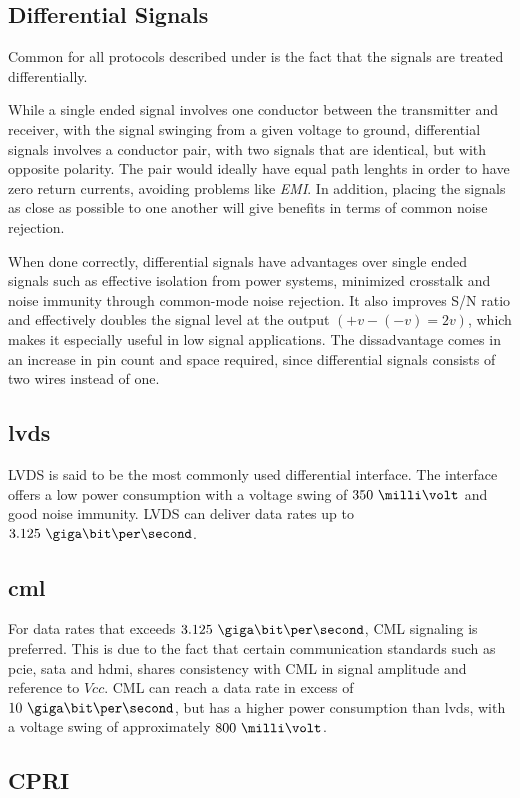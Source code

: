 \documentclass[main.tex]{subfiles}
\begin{document}
\subsection{Differential Signals} \label{subsec:diffsig}

Common for all protocols described under is the fact that the signals are treated differentially. 

While a single ended signal involves one conductor between the transmitter and receiver, with the signal swinging from a given voltage to ground, differential signals involves a conductor pair, with two signals that are identical, but with opposite polarity. The pair would ideally have equal path lenghts in order to have zero return currents, avoiding problems like \textit{EMI}. In addition, placing the signals as close as possible to one another will give benefits in terms of common noise rejection.

When done correctly, differential signals have advantages over single ended signals such as effective isolation from power systems, minimized crosstalk and noise immunity through common-mode noise rejection. It also improves S/N ratio and effectively doubles the signal level at the output $(+v - (-v) = 2v)$, which makes it especially useful in low signal applications. The dissadvantage comes in an increase in pin count and space required, since differential signals consists of two wires instead of one. \cite{douglas01}

\subsection{\acrfull{lvds}}

LVDS is said to be the most commonly used differential interface. The interface offers a low power consumption with a voltage swing of $350\ \milli\volt$ and good noise immunity. LVDS can deliver data rates up to $3.125\ \giga\bit\per\second$. \cite{ti08lvds}

\subsection{\acrfull{cml}}

For data rates that exceeds $3.125\ \giga\bit\per\second$, CML signaling is preferred. This is due to the fact that certain communication standards such as \acrshort{pcie}, \acrshort{sata} and \acrshort{hdmi}, shares consistency with CML in signal amplitude and reference to $Vcc$. CML can reach a data rate in excess of $10\ \giga\bit\per\second$, but has a higher power consumption than \gls{lvds}, with a voltage swing of approximately $800\ \milli\volt$. \cite{ti08lvds}

\subsection{CPRI}



\end{document}
